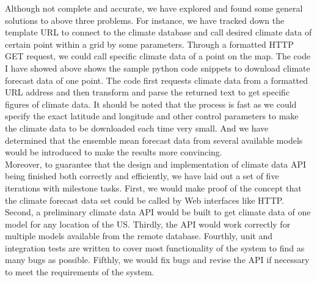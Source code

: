 \documentclass[onecolumn, draftclsnofoot,10pt, compsoc]{article}
\begin{document}
		Although not complete and accurate, we have explored and found some general solutions to above three problems. For instance, we have tracked down the template URL to connect to the climate database and call desired climate data of certain point within a grid by some parameters. Through a formatted HTTP GET request, we could call specific climate data of a point on the map. The code I have showed above shows the sample python code snippets to download climate forecast data of one point. The code first requests climate data from a formatted URL address and then transform and parse the returned text to get specific figures of climate data. It should be noted that the process is fast as we could specify the exact latitude and longitude and other control parameters to make the climate data to be downloaded each time very small. And we have determined that the ensemble mean forecast data from several available models would be introduced to make the results more convincing. \\
		Moreover, to guarantee that the design and implementation of climate data API being finished both correctly and efficiently, we have laid out a set of five iterations with milestone tasks. First, we would make proof of the concept that the climate forecast data set could be called by Web interfaces like HTTP. Second, a preliminary climate data API would be built to get climate data of one model for any location of the US. Thirdly, the API would work correctly for multiple models available from the remote database. Fourthly, unit and integration tests are written to cover most functionality of the system to find as many bugs as possible. Fifthly, we would fix bugs and revise the API if necessary to meet the requirements of the system.\\
\end{document}
